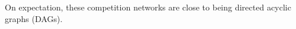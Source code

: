 \documentclass[preview]{standalone}
\begin{document}
On expectation, these competition networks are close to being directed acyclic graphs (DAGs).\\
\end{document}
